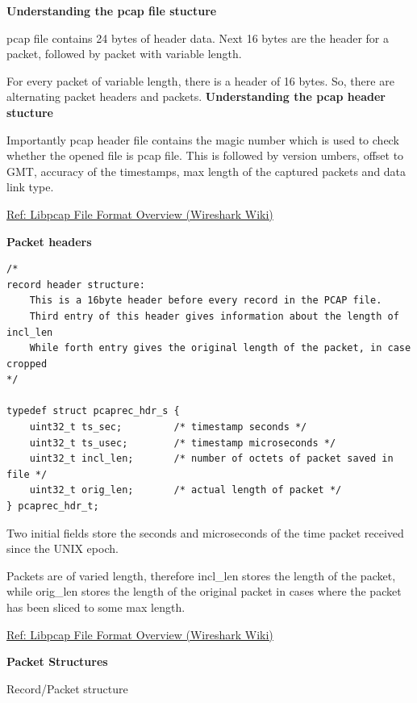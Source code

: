 \documentclass[12pt, a4paper]{report}
\begin{document}
\textbf{Understanding the pcap file stucture}

pcap file contains 24 bytes of header data. Next 16 bytes are the header for a packet, followed by packet with variable length. 

For every packet of variable length, there is a header of 16 bytes. So, there are alternating packet headers and packets.
\newpage
\textbf{Understanding the pcap header stucture}

Importantly pcap header file contains the magic number which is used to check whether the opened file is pcap file.
\newline 
This is followed by version umbers, offset to GMT, accuracy of the timestamps, max length of the captured packets and data link type.

\noindent\href{https://wiki.wireshark.org/Development/LibpcapFileFormat\#overview}{Ref: Libpcap File Format Overview (Wireshark Wiki)}

\vspace{1em}
\textbf{Packet headers}

\begin{lstlisting}[caption={Packet headers}]
/*
record header structure:
    This is a 16byte header before every record in the PCAP file.
    Third entry of this header gives information about the length of incl_len
    While forth entry gives the original length of the packet, in case cropped
*/

typedef struct pcaprec_hdr_s {
    uint32_t ts_sec;         /* timestamp seconds */
    uint32_t ts_usec;        /* timestamp microseconds */
    uint32_t incl_len;       /* number of octets of packet saved in file */
    uint32_t orig_len;       /* actual length of packet */
} pcaprec_hdr_t;
\end{lstlisting}

Two initial fields store the seconds and microseconds of the time packet received since the UNIX epoch.

Packets are of varied length, therefore incl\_len stores the length of the packet, while orig\_len stores the length of the original packet in cases where the packet has been sliced to some max length.

\noindent\href{https://wiki.wireshark.org/Development/LibpcapFileFormat\#overview}{Ref: Libpcap File Format Overview (Wireshark Wiki)}


\newpage
\vspace{1em}
\textbf{Packet Structures}

Record/Packet structure
\end{document}

